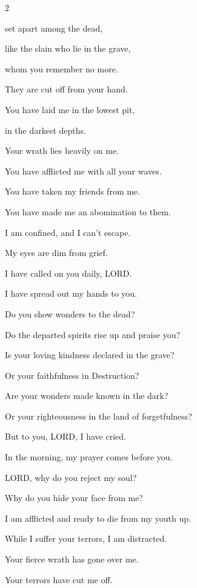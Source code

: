 \begin{multicols}{2}
	
	\myverse{}set apart among the dead,
	
	like the slain who lie in the grave,
	
	whom you remember no more.
	
	They are cut off from your hand.
	
	
	\myverse{}You have laid me in the lowest pit,
	
	in the darkest depths.
	
	
	\myverse{}Your wrath lies heavily on me.
	
	You have afflicted me with all your waves.
	
	\vspace{\baselineskip}
	
	
	\myverse{}You have taken my friends from me.
	
	You have made me an abomination to them.
	
	I am confined, and I can’t escape.
	
	
	\myverse{}My eyes are dim from grief.
	
	I have called on you daily, LORD.
	
	I have spread out my hands to you.
	
	
	\myverse{}Do you show wonders to the dead?
	
	Do the departed spirits rise up and praise you?
	
	\vspace{\baselineskip}
	
	
	\myverse{}Is your loving kindness declared in the grave?
	
	Or your faithfulness in Destruction?
	
	
	\myverse{}Are your wonders made known in the dark?
	
	Or your righteousness in the land of forgetfulness?
	
	
	\myverse{}But to you, LORD, I have cried.
	
	In the morning, my prayer comes before you.
	
	
	\myverse{}LORD, why do you reject my soul?
	
	Why do you hide your face from me?
	
	
	\myverse{}I am afflicted and ready to die from my youth up.
	
	While I suffer your terrors, I am distracted.
	
	
	\myverse{}Your fierce wrath has gone over me.
	
	Your terrors have cut me off.
	

\end{multicols}
